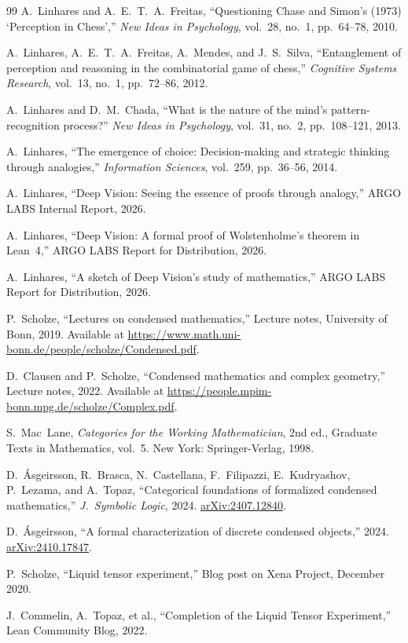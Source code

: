 \documentclass[11pt]{article}
\theoremstyle{definition}
\theoremstyle{remark}
\begin{document}
\begin{thebibliography}{99}
A.~Linhares and A.~E.~T.~A.~Freitas, ``Questioning Chase and Simon's (1973) `Perception in Chess','' \emph{New Ideas in Psychology}, vol.~28, no.~1, pp.~64--78, 2010.

A.~Linhares, A.~E.~T.~A.~Freitas, A.~Mendes, and J.~S.~Silva, ``Entanglement of perception and reasoning in the combinatorial game of chess,'' \emph{Cognitive Systems Research}, vol.~13, no.~1, pp.~72--86, 2012.

A.~Linhares and D.~M.~Chada, ``What is the nature of the mind's pattern-recognition process?'' \emph{New Ideas in Psychology}, vol.~31, no.~2, pp.~108--121, 2013.

A.~Linhares, ``The emergence of choice: Decision-making and strategic thinking through analogies,'' \emph{Information Sciences}, vol.~259, pp.~36--56, 2014.

A.~Linhares, ``Deep Vision: Seeing the essence of proofs through analogy,'' ARGO LABS Internal Report, 2026.

A.~Linhares,
``Deep Vision: A formal proof of Wolstenholme's theorem in Lean~4,''
ARGO LABS Report for Distribution, 2026.

A.~Linhares,
``A sketch of Deep Vision's study of mathematics,''
ARGO LABS Report for Distribution, 2026.

P.~Scholze,
``Lectures on condensed mathematics,''
Lecture notes, University of Bonn, 2019.
Available at \url{https://www.math.uni-bonn.de/people/scholze/Condensed.pdf}.

D.~Clausen and P.~Scholze,
``Condensed mathematics and complex geometry,''
Lecture notes, 2022.
Available at \url{https://people.mpim-bonn.mpg.de/scholze/Complex.pdf}.

S.~Mac~Lane,
\emph{Categories for the Working Mathematician},
2nd ed., Graduate Texts in Mathematics, vol.~5.
New York: Springer-Verlag, 1998.

D.~\'Asgeirsson, R.~Brasca, N.~Castellana, F.~Filipazzi,
E.~Kudryashov, P.~Lezama, and A.~Topaz,
``Categorical foundations of formalized condensed mathematics,''
\emph{J.~Symbolic Logic}, 2024.
\href{https://arxiv.org/abs/2407.12840}{arXiv:2407.12840}.

D.~\'Asgeirsson,
``A formal characterization of discrete condensed objects,''
2024.
\href{https://arxiv.org/abs/2410.17847}{arXiv:2410.17847}.

P.~Scholze,
``Liquid tensor experiment,''
Blog post on Xena Project, December 2020.

J.~Commelin, A.~Topaz, et al.,
``Completion of the Liquid Tensor Experiment,''
Lean Community Blog, 2022.

\end{thebibliography}
\end{document}
